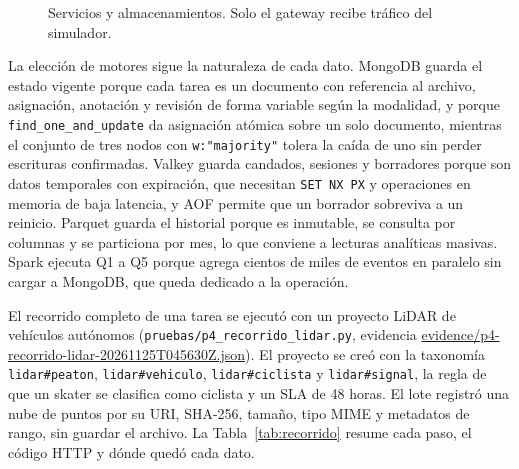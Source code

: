 \documentclass[conference]{IEEEtran}
\begin{document}
\begin{figure}[!t]
\centering
{}
\caption{Servicios y almacenamientos. Solo el gateway recibe tráfico del simulador.}
\label{fig:arq}
\end{figure}

La elección de motores sigue la naturaleza de cada dato. MongoDB guarda el estado vigente porque cada tarea es un documento con referencia al archivo, asignación, anotación y revisión de forma variable según la modalidad, y porque \texttt{find\_one\_and\_update} da asignación atómica sobre un solo documento, mientras el conjunto de tres nodos con \texttt{w:"majority"} tolera la caída de uno sin perder escrituras confirmadas. Valkey guarda candados, sesiones y borradores porque son datos temporales con expiración, que necesitan \texttt{SET NX PX} y operaciones en memoria de baja latencia, y AOF permite que un borrador sobreviva a un reinicio. Parquet guarda el historial porque es inmutable, se consulta por columnas y se particiona por mes, lo que conviene a lecturas analíticas masivas. Spark ejecuta Q1 a Q5 porque agrega cientos de miles de eventos en paralelo sin cargar a MongoDB, que queda dedicado a la operación.

El recorrido completo de una tarea se ejecutó con un proyecto LiDAR de vehículos autónomos (\texttt{pruebas/p4\_recorrido\_lidar.py}, evidencia \url{evidence/p4-recorrido-lidar-20261125T045630Z.json}). El proyecto se creó con la taxonomía \texttt{lidar\#peaton}, \texttt{lidar\#vehiculo}, \texttt{lidar\#ciclista} y \texttt{lidar\#signal}, la regla de que un skater se clasifica como ciclista y un SLA de 48 horas. El lote registró una nube de puntos por su URI, SHA-256, tamaño, tipo MIME y metadatos de rango, sin guardar el archivo. La Tabla~\ref{tab:recorrido} resume cada paso, el código HTTP y dónde quedó cada dato.
\end{document}
